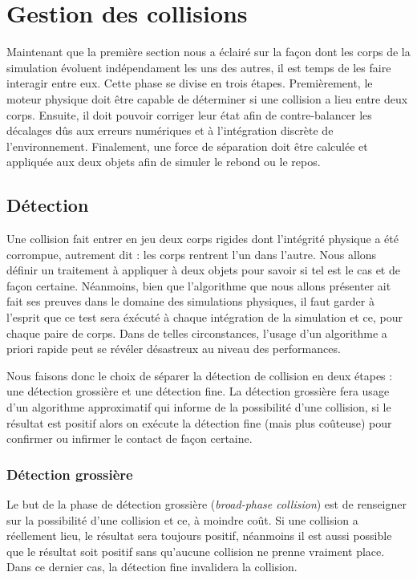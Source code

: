 \section{Gestion des collisions}

Maintenant que la première section nous a éclairé sur la façon dont
les corps de la simulation évoluent indépendament les uns des autres,
il est temps de les faire interagir entre eux. Cette phase se divise
en trois étapes. Premièrement, le moteur physique doit être capable de
déterminer si une collision a lieu entre deux corps. Ensuite, il doit
pouvoir corriger leur état afin de contre-balancer les décalages dûs
aux erreurs numériques et à l'intégration discrète de
l'environnement. Finalement, une force de séparation doit être
calculée et appliquée aux deux objets afin de simuler le rebond ou le
repos.

\subsection{Détection}

Une collision fait entrer en jeu deux corps rigides dont l'intégrité
physique a été corrompue, autrement dit : les corps rentrent l'un dans
l'autre. Nous allons définir un traitement à appliquer à deux objets
pour savoir si tel est le cas et de façon certaine. Néanmoins, bien
que l'algorithme que nous allons présenter ait fait ses preuves
dans le domaine des simulations physiques, il faut garder à l'esprit
que ce test sera éxécuté à chaque intégration de la simulation et ce,
pour chaque paire de corps. Dans de telles circonstances, l'usage d'un
algorithme a priori rapide peut se révéler désastreux au niveau des
performances.

Nous faisons donc le choix de séparer la détection de collision en
deux étapes : une détection grossière et une détection fine. La
détection grossière fera usage d'un algorithme approximatif qui
informe de la possibilité d'une collision, si le résultat est positif
alors on exécute la détection fine (mais plus coûteuse) pour confirmer
ou infirmer le contact de façon certaine.

\subsubsection{Détection grossière}

Le but de la phase de détection grossière (\textit{broad-phase
  collision}) est de renseigner sur la possibilité d'une collision et
ce, à moindre coût. Si une collision a réellement lieu, le résultat
sera toujours positif, néanmoins il est aussi possible que le résultat
soit positif sans qu'aucune collision ne prenne vraiment place. Dans
ce dernier cas, la détection fine invalidera la collision.

